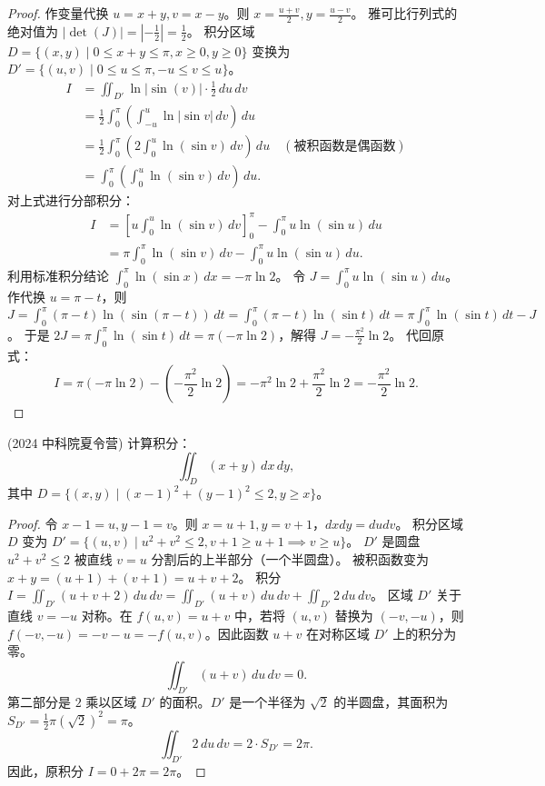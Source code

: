 \documentclass[lang=cn,10pt,thmcnt=section]{elegantbook}
\begin{document}
\begin{proof}
作变量代换 $u = x+y, v = x-y$。则 $x = \frac{u+v}{2}, y = \frac{u-v}{2}$。
雅可比行列式的绝对值为 $|\det(J)| = |-\frac{1}{2}| = \frac{1}{2}$。
积分区域 $D = \{ (x,y) \mid 0 \le x+y \le \pi, x \ge 0, y \ge 0 \}$ 变换为 $D' = \{ (u,v) \mid 0 \le u \le \pi, -u \le v \le u \}$。
\begin{align*}
I &= \iint_{D'} \ln|\sin(v)| \cdot \frac{1}{2} \, du \, dv \\
&= \frac{1}{2} \int_0^{\pi} \left( \int_{-u}^{u} \ln|\sin v| \, dv \right) \, du \\
&= \frac{1}{2} \int_0^{\pi} \left( 2 \int_0^u \ln(\sin v) \, dv \right) \, du \quad (\text{被积函数是偶函数}) \\
&= \int_0^{\pi} \left( \int_0^u \ln(\sin v) \, dv \right) \, du.
\end{align*}
对上式进行分部积分：
\begin{align*}
I &= \left[ u \int_0^u \ln(\sin v) \, dv \right]_0^\pi - \int_0^\pi u \ln(\sin u) \, du \\
&= \pi \int_0^\pi \ln(\sin v) \, dv - \int_0^\pi u \ln(\sin u) \, du.
\end{align*}
利用标准积分结论 $\int_0^\pi \ln(\sin x) \, dx = -\pi \ln 2$。
令 $J = \int_0^\pi u \ln(\sin u) \, du$。作代换 $u = \pi - t$，则
$J = \int_0^\pi (\pi-t) \ln(\sin(\pi-t)) \, dt = \int_0^\pi (\pi-t) \ln(\sin t) \, dt = \pi \int_0^\pi \ln(\sin t) \, dt - J$。
于是 $2J = \pi \int_0^\pi \ln(\sin t) \, dt = \pi (-\pi \ln 2)$，解得 $J = -\frac{\pi^2}{2} \ln 2$。
代回原式：
\[
I = \pi (-\pi \ln 2) - \left(-\frac{\pi^2}{2} \ln 2\right) = -\pi^2 \ln 2 + \frac{\pi^2}{2} \ln 2 = -\frac{\pi^2}{2} \ln 2.
\]
\end{proof}

\begin{example}
    (2024 中科院夏令营) 计算积分：
\[
\iint_{D} (x + y) \, dx \, dy,
\]
其中 $D = \{ (x, y) \mid (x - 1)^2 + (y - 1)^2 \leq 2, y \geq x \}$。
\end{example}

\begin{proof}
令 $x-1 = u, y-1 = v$。则 $x = u+1, y=v+1$，$dxdy = dudv$。
积分区域 $D$ 变为 $D' = \{ (u, v) \mid u^2 + v^2 \leq 2, v+1 \geq u+1 \implies v \geq u \}$。
$D'$ 是圆盘 $u^2+v^2 \le 2$ 被直线 $v=u$ 分割后的上半部分（一个半圆盘）。
被积函数变为 $x+y = (u+1)+(v+1) = u+v+2$。
积分 $I = \iint_{D'} (u + v + 2) \, du \, dv = \iint_{D'} (u+v) \, du \, dv + \iint_{D'} 2 \, du \, dv$。
区域 $D'$ 关于直线 $v=-u$ 对称。在 $f(u,v) = u+v$ 中，若将 $(u,v)$ 替换为 $(-v,-u)$，则 $f(-v,-u) = -v-u = -f(u,v)$。因此函数 $u+v$ 在对称区域 $D'$ 上的积分为零。
\[
\iint_{D'} (u+v) \, du \, dv = 0.
\]
第二部分是 $2$ 乘以区域 $D'$ 的面积。$D'$ 是一个半径为 $\sqrt{2}$ 的半圆盘，其面积为 $S_{D'} = \frac{1}{2} \pi (\sqrt{2})^2 = \pi$。
\[
\iint_{D'} 2 \, du \, dv = 2 \cdot S_{D'} = 2\pi.
\]
因此，原积分 $I = 0 + 2\pi = 2\pi$。
\end{proof}
\end{document}
